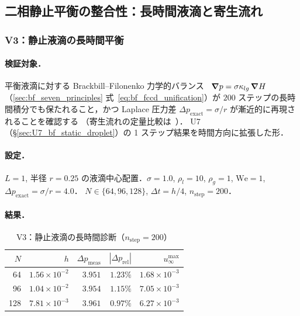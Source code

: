 %
\subsection{二相静止平衡の整合性：長時間液滴と寄生流れ}
\label{sec:twophase_static_verification}

\subsubsection{V3：静止液滴の長時間平衡}
\label{sec:bf_static_droplet}
\label{sec:twophase_static_longterm}

\paragraph{検証対象．}
平衡液滴に対する Brackbill--Filonenko 力学的バランス~\cite{Brackbill1992}
$\bm{\nabla} p = \sigma\kappa_{lg}\,\bm{\nabla} H$（\autoref{sec:bf_seven_principles} 式~\eqref{eq:bf_fccd_unification}）が
$200$ ステップの長時間積分でも保たれること，かつ Laplace 圧力差
$\Delta p_{\mathrm{exact}} = \sigma / r$ が漸近的に再現されることを確認する
（寄生流れの定量比較は~\cite{Popinet2009,DennerVanWachem2015,HarvieDavidsonRudman2006}）．
U7（§\ref{sec:U7_bf_static_droplet}）の 1 ステップ結果を時間方向に拡張した形．

\paragraph{設定．}
$L=1$, 半径 $r = 0.25$ の液滴中心配置．$\sigma = 1.0$, $\rho_l = 10$, $\rho_g = 1$, $\mathrm{We} = 1$,
$\Delta p_{\mathrm{exact}} = \sigma / r = 4.0$．
$N \in \{64, 96, 128\}$, $\Delta t = h/4$, $n_{\mathrm{step}} = 200$．

\paragraph{結果．}
\begin{table}[!ht]
\caption{V3：静止液滴の長時間診断（\texorpdfstring{$n_{\mathrm{step}}=200$}{n_step=200}）}
\label{tab:V3_droplet}
\centering\small
\begin{tabular}{r r r r r}
\toprule
$N$ & $h$ & $\Delta p_{\mathrm{meas}}$ & $|\Delta p_{\mathrm{rel}}|$ & $u_\infty^{\max}$ \\
\midrule
64  & $1.56\times 10^{-2}$ & $3.951$ & $1.23\%$ & $1.68\times 10^{-3}$ \\
96  & $1.04\times 10^{-2}$ & $3.954$ & $1.15\%$ & $7.05\times 10^{-3}$ \\
128 & $7.81\times 10^{-3}$ & $3.961$ & $0.97\%$ & $6.27\times 10^{-3}$ \\
\bottomrule
\end{tabular}
\end{table}

